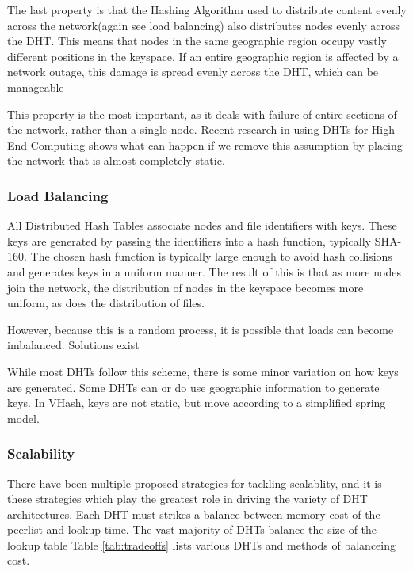 \documentclass[10pt,letterpaper]{report}
\begin{document}
The last property is that the Hashing Algorithm used to distribute content evenly across the network(again see load balancing) also distributes nodes evenly across the DHT.  
This means that nodes in the same geographic region occupy vastly different positions in the keyspace.  
If an entire geographic region is affected by a network outage, this damage is spread evenly across the DHT, which can be manageable

This property is the most important, as it deals with failure of entire sections of the network, rather than a single node.
Recent research in using DHTs for High End Computing \cite{li2013zht} shows what can happen if we remove this assumption by placing the network that is almost completely static.



\subsubsection{Load Balancing}
All Distributed Hash Tables associate nodes and file identifiers with keys.  
These keys are generated by passing the identifiers into a hash function, typically SHA-160.
The chosen hash function is typically large enough to avoid hash collisions and generates keys in a uniform manner. 
The result of this is that as more nodes join the network, the distribution of nodes in the keyspace becomes more uniform, as does the distribution of files.

However, because this is a random process, it is possible that loads can become imbalanced.
Solutions exist \cite{}%


While most DHTs follow this scheme, there is some minor variation on how keys are generated.
Some DHTs can or do use geographic information to generate keys.
In VHash, keys are not static, but move according to a simplified spring model.

\subsubsection{Scalability}
There have been multiple proposed strategies for tackling scalablity, and it is these strategies which play the greatest role in driving the variety of DHT architectures. 
Each DHT must strikes a balance between memory cost of the peerlist and lookup time. 
The vast majority of DHTs balance the size of the lookup table
Table \ref{tab:tradeoffs} lists various DHTs and methods of balanceing cost.
\end{document}
